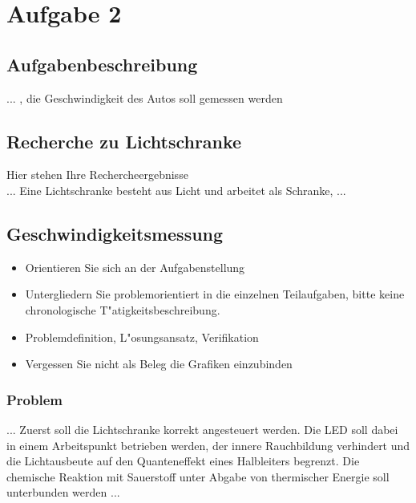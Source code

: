 \section{Aufgabe 2}

\subsection{Aufgabenbeschreibung}
	... , die Geschwindigkeit des Autos soll gemessen werden
\subsection{Recherche zu Lichtschranke}
Hier stehen Ihre Rechercheergebnisse\\
... Eine Lichtschranke besteht aus Licht und arbeitet als Schranke, ...
\subsection{Geschwindigkeitsmessung}
\begin{itemize}
	\item Orientieren Sie sich an der Aufgabenstellung
	\item Untergliedern Sie problemorientiert in die einzelnen Teilaufgaben, bitte keine chronologische T"atigkeitsbeschreibung.
	\item Problemdefinition, L"osungsansatz, Verifikation
	\item Vergessen Sie nicht als Beleg die Grafiken einzubinden
\end{itemize}

\subsubsection{Problem}
... Zuerst soll die Lichtschranke korrekt angesteuert werden. Die LED soll dabei in einem Arbeitspunkt betrieben werden, der innere Rauchbildung verhindert und die Lichtausbeute auf den Quanteneffekt eines Halbleiters begrenzt. Die chemische Reaktion mit Sauerstoff unter Abgabe von thermischer Energie soll unterbunden werden ...\\

